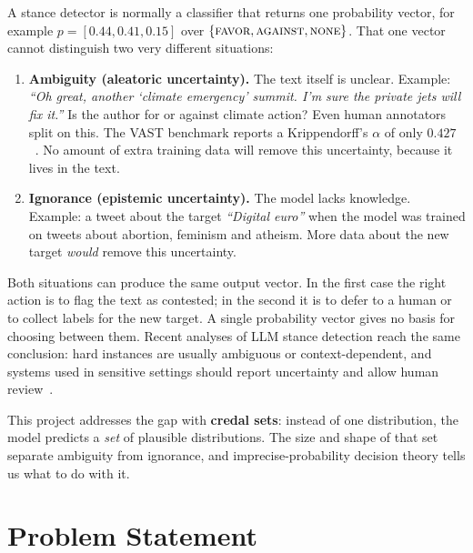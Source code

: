 \documentclass[11pt,a4paper]{article}
\begin{document}
A stance detector is normally a classifier that returns one probability vector, for
example $p = [0.44, 0.41, 0.15]$ over $\{\textsc{favor}, \textsc{against}, \textsc{none}\}$.
That one vector cannot distinguish two very different situations:

\begin{enumerate}[leftmargin=*]
  \item \textbf{Ambiguity (aleatoric uncertainty).} The text itself is unclear. Example:
  \emph{``Oh great, another `climate emergency' summit. I'm sure the private jets will fix
  it.''} Is the author for or against climate action? Even human annotators split on this.
  The VAST benchmark reports a Krippendorff's $\alpha$ of only $0.427$~\cite{allaway2020}.
  No amount of extra training data will remove this uncertainty, because it lives in the
  text.

  \item \textbf{Ignorance (epistemic uncertainty).} The model lacks knowledge. Example: a
  tweet about the target \emph{``Digital euro''} when the model was trained on tweets about
  abortion, feminism and atheism. More data about the new target \emph{would} remove this
  uncertainty.
\end{enumerate}

Both situations can produce the same output vector. In the first case the right action is
to flag the text as contested; in the second it is to defer to a human or to collect labels
for the new target. A single probability vector gives no basis for choosing between them.
Recent analyses of LLM stance detection reach the same conclusion: hard instances are
usually ambiguous or context-dependent, and systems used in sensitive settings should report
uncertainty and allow human review~\cite{sici2026}.

This project addresses the gap with \textbf{credal sets}: instead of one distribution, the
model predicts a \emph{set} of plausible distributions. The size and shape of that set
separate ambiguity from ignorance, and imprecise-probability decision theory tells us what
to do with it.

\section{Problem Statement}
\end{document}
